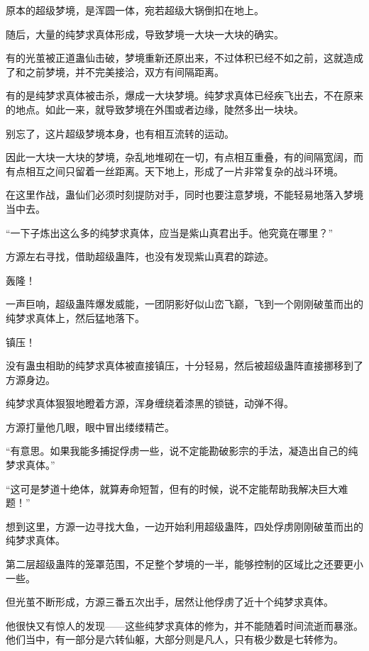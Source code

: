 \begin{this_body}
原本的超级梦境，是浑圆一体，宛若超级大锅倒扣在地上。

随后，大量的纯梦求真体形成，导致梦境一大块一大块的确实。

有的光茧被正道蛊仙击破，梦境重新还原出来，不过体积已经不如之前，这就造成了和之前梦境，并不完美接洽，双方有间隔距离。

有的是纯梦求真体被击杀，爆成一大块梦境。纯梦求真体已经疾飞出去，不在原来的地点。如此一来，就导致梦境在外围或者边缘，陡然多出一块块。

别忘了，这片超级梦境本身，也有相互流转的运动。

因此一大块一大块的梦境，杂乱地堆砌在一切，有点相互重叠，有的间隔宽阔，而有点相互之间只留着一丝距离。天下地上，形成了一片非常复杂的战斗环境。

在这里作战，蛊仙们必须时刻提防对手，同时也要注意梦境，不能轻易地落入梦境当中去。

“一下子炼出这么多的纯梦求真体，应当是紫山真君出手。他究竟在哪里？”

方源左右寻找，借助超级蛊阵，也没有发现紫山真君的踪迹。

轰隆！

一声巨响，超级蛊阵爆发威能，一团阴影好似山峦飞巅，飞到一个刚刚破茧而出的纯梦求真体上，然后猛地落下。

镇压！

没有蛊虫相助的纯梦求真体被直接镇压，十分轻易，然后被超级蛊阵直接挪移到了方源身边。

纯梦求真体狠狠地瞪着方源，浑身缠绕着漆黑的锁链，动弹不得。

方源打量他几眼，眼中冒出缕缕精芒。

“有意思。如果我能多捕捉俘虏一些，说不定能勘破影宗的手法，凝造出自己的纯梦求真体。”

“这可是梦道十绝体，就算寿命短暂，但有的时候，说不定能帮助我解决巨大难题！”

想到这里，方源一边寻找大鱼，一边开始利用超级蛊阵，四处俘虏刚刚破茧而出的纯梦求真体。

第二层超级蛊阵的笼罩范围，不足整个梦境的一半，能够控制的区域比之还要更小一些。

但光茧不断形成，方源三番五次出手，居然让他俘虏了近十个纯梦求真体。

他很快又有惊人的发现——这些纯梦求真体的修为，并不能随着时间流逝而暴涨。他们当中，有一部分是六转仙躯，大部分则是凡人，只有极少数是七转修为。

\end{this_body}

